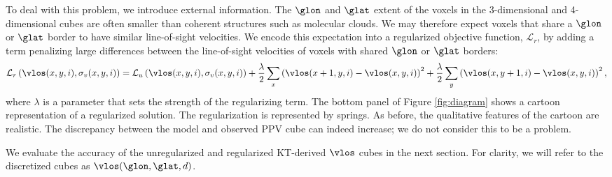 To deal with this problem, we introduce external information.
The $\glon$ and $\glat$ extent of the voxels in the 3-dimensional and 4-dimensional cubes are often smaller than coherent structures such as molecular clouds. 
We may therefore expect voxels that share a $\glon$ or $\glat$ border to have similar line-of-sight velocities.
We encode this expectation into a regularized objective function, $\mathcal{L}_r$, by adding a term penalizing large differences between the line-of-sight velocities of voxels with shared $\glon$ or $\glat$ borders:
\begin{equation}
  \label{eqn:obj_reg}
  \mathcal{L}_r\left(\vlos(x, y, i), \sigma_v(x, y, i) \right) = 
  \mathcal{L}_u \left(\vlos(x, y, i), \sigma_v(x, y, i) \right) 
  + \frac{\lambda}{2} \sum_{x} \left( \vlos(x + 1, y, i) - \vlos(x, y, i) \right)^2
  + \frac{\lambda}{2} \sum_{y} \left( \vlos(x, y + 1, i) - \vlos(x, y, i) \right)^2,
\end{equation}
where $\lambda$ is a parameter that sets the strength of the regularizing term. 
The bottom panel of Figure \ref{fig:diagram} shows a cartoon representation of a regularized solution. 
The regularization is represented by springs. 
As before, the qualitative features of the cartoon are realistic. 
The discrepancy between the model and observed PPV cube can indeed increase; we do not consider this to be a problem. 

We evaluate the accuracy of the unregularized and regularized KT-derived $\vlos$ cubes in the next section. 
For clarity, we will refer to the discretized cubes as $\vlos(\glon, \glat, d)$. 



